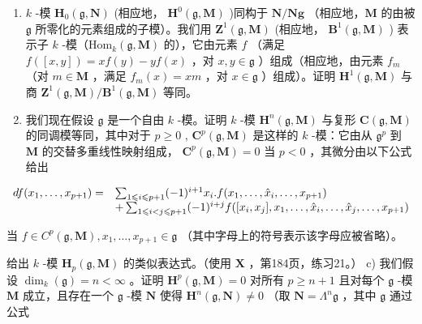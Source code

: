 \begin{enumerate}
\def\labelenumi{\alph{enumi})}
\item
  \(k\) -模 \(\mathbf{H}_0(\mathfrak{g}, \mathbf{N})\) (相应地， \(\mathbf{H}^0(\mathfrak{g}, \mathbf{M})\) )同构于 \(\mathbf{N}/\mathbf{Ng}\) （相应地，\(\mathbf{M}\) 的由被 \(\mathfrak{g}\) 所零化的元素组成的子模）。我们用 \(\mathbf{Z}^1(\mathfrak{g}, \mathbf{M})\) (相应地， \(\mathbf{B}^1(\mathfrak{g}, \mathbf{M})\) ) 表示子 \(k\) -模（\(\mathrm{Hom}_k(\mathfrak{g}, \mathbf{M})\) 的），它由元素 \(f\) （满足 \(f([x, y]) = xf(y) - yf(x)\) ，对 \(x, y \in \mathfrak{g}\) ）组成（相应地，由元素 \(f_m\) （对 \(m \in \mathbf{M}\) ，满足 \(f_m(x) = xm\) ，对 \(x \in \mathfrak{g}\) ）组成）。证明 \(\mathbf{H}^1(\mathfrak{g}, \mathbf{M})\) 与商 \(\mathbf{Z}^1(\mathfrak{g}, \mathbf{M})/\mathbf{B}^1(\mathfrak{g}, \mathbf{M})\) 等同。
\item
  我们现在假设 \(\mathfrak{g}\) 是一个自由 \(k\) -模。证明 \(k\) -模 \(\mathbf{H}^n(\mathfrak{g}, \mathbf{M})\) 与复形 \(\mathbf{C}(\mathfrak{g}, \mathbf{M})\) 的同调模等同，其中对于 \(p \geqslant 0\) , \(\mathbf{C}^p(\mathfrak{g}, \mathbf{M})\) 是这样的 \(k\) -模：它由从 \(\mathfrak{g}^p\) 到 \(\mathbf{M}\) 的交替多重线性映射组成， \(\mathbf{C}^p(\mathfrak{g}, \mathbf{M}) = 0\) 当 \(p < 0\) ，其微分由以下公式给出
\end{enumerate}

\[
\begin{array}{r l} d f (x _ {1}, \dots , x _ {p + 1}) = & \sum_ {1 \leqslant i \leqslant p + 1} (- 1) ^ {i + 1} x _ {i}. f (x _ {1}, \dots , \hat {x} _ {i}, \dots , x _ {p + 1}) \\ & + \sum_ {1 \leqslant i <   j \leqslant p + 1} (- 1) ^ {i + j} f ([ x _ {i}, x _ {j} ], x _ {1}, \dots , \hat {x} _ {i}, \dots , \hat {x} _ {j}, \dots , x _ {p + 1}) \end{array}
\]

当 \(f \in C^{p}(\mathfrak{g}, \mathbf{M}), x_{1}, \ldots, x_{p+1} \in \mathfrak{g}\) （其中字母上的符号表示该字母应被省略）。

给出 \(k\) -模 \(\mathbf{H}_p(\mathfrak{g}, \mathbf{M})\) 的类似表达式。（使用 \(\mathbf{X}\) ，第184页，练习21。） c) 我们假设 \(\dim_k(\mathfrak{g}) = n < \infty\) 。证明 \(\mathbf{H}^p(\mathfrak{g}, \mathbf{M}) = 0\) 对所有 \(p \geqslant n + 1\) 且对每个 \(\mathfrak{g}\) -模 \(\mathbf{M}\) 成立，且存在一个 \(\mathfrak{g}\) -模 \(\mathbf{N}\) 使得 \(\mathbf{H}^n(\mathfrak{g}, \mathbf{N}) \neq 0\) （取 \(\mathbf{N} = \Lambda^n\mathfrak{g}\) ，其中 \(\mathfrak{g}\) 通过公式

